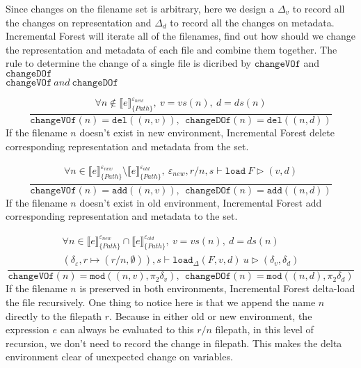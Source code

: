 \documentclass[10pt,twoside,a4paper]{article}
\theoremstyle{theorem}
\theoremstyle{lemma}
\theoremstyle{property}
\theoremstyle{definition}
\theoremstyle{assumption}
\def\snd{\pi_2}
\begin{document}
Since changes on the filename set is arbitrary, here we design a $\Delta_v$ to record all the changes on representation and $\Delta_d$ to record all the changes on metadata. Incremental Forest will iterate all of the filenames, find out how should we change the representation and metadata of each file and combine them together. The rule to determine the change of a single file is dicribed by $\mathtt{changeVOf}$ and $\mathtt{changeDOf}$\\ 

$\boxed{\mathtt{changeVOf} ~ and ~ \mathtt{changeDOf}}$

\begin{displaymath}
	\frac
	{\forall n \not\in \llbracket e \rrbracket^{\varepsilon_{new}}_{\{Path\}},~ v = vs(n), ~d = ds(n)}
	{\mathtt{changeVOf}(n) = \mathtt{del}((n,v)), ~~\mathtt{changeDOf}(n) = \mathtt{del}((n,d))}
\end{displaymath}
If the filename $n$ doesn't exist in new environment, Incremental Forest delete corresponding representation and metadata from the set.

\begin{displaymath}
	\frac{\begin{array}{c}
	\forall n \in \llbracket e \rrbracket^{\varepsilon_{new}}_{\{Path\}} \setminus \llbracket e \rrbracket^{\varepsilon_{old}}_{\{Path\}}, ~ \varepsilon_{new}, r/n,s \vdash \mathtt{load}~F \rhd (v, d)
	\end{array}}
	{\mathtt{changeVOf}(n) = \mathtt{add}((n,v)), ~~\mathtt{changeDOf}(n) = \mathtt{add}((n,d))}
\end{displaymath}
If the filename $n$ doesn't exist in old environment, Incremental Forest add corresponding representation and metadata to the set.

\begin{displaymath}
	\frac{\begin{array}{c}
	\forall n \in \llbracket e \rrbracket^{\varepsilon_{new}}_{\{Path\}} \cap \llbracket e \rrbracket^{\varepsilon_{old}}_{\{Path\}}, ~ v = vs(n), ~d = ds(n)\\
	(\delta_\varepsilon, r \mapsto (r/n, \emptyset)), s \vdash \mathtt{load}_\Delta (F,v,d)~ u \rhd (\delta_v,\delta_d)
	\end{array}}
	{\mathtt{changeVOf}(n) = \mathtt{mod}((n,v), \snd\delta_v), ~~\mathtt{changeDOf}(n) = \mathtt{mod}((n,d), \snd\delta_d)}
\end{displaymath}
If the filename $n$ is preserved in both environments, Incremental Forest delta-load the file recursively. One thing to notice here is that we append the name $n$ directly to the filepath $r$. Because in either old or new environment, the expression $e$ can always be evaluated to this $r/n$ filepath, in this level of recursion, we don't need to record the change in filepath. This makes the delta environment clear of unexpected change on variables.
\end{document}
